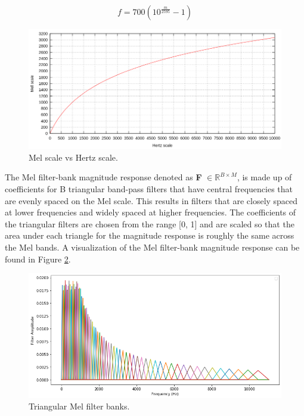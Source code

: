 \begin{equation}
\label{eq:mel2freq}
    f = 700 \left(10^{\frac{m}{2595}} - 1 \right)
\end{equation}


\begin{figure}[htbp]
   \begin{center}
      \includegraphics[width=0.8\linewidth]{Chapitre1/figures/Mel-Hz_plot.svg.png}
   \end{center}
   \caption
   {Mel scale vs Hertz scale.}
   \label{fig:melvshertz}
\end{figure}


The Mel filter-bank magnitude response denoted as \textbf{F} $ \in \mathbb{R} ^{B \times M}$, is made up of coefficients for B triangular band-pass filters that have central frequencies that are evenly spaced on the Mel scale. This results in filters that are closely spaced at lower frequencies and widely spaced at higher frequencies. The coefficients of the triangular filters are chosen from the range [0, 1] and are scaled so that the area under each triangle for the magnitude response is roughly the same across the Mel bands. A visualization of the Mel filter-bank magnitude response can be found in Figure \ref{fig:melfilterbanks}.

\begin{figure}[htbp]
   \begin{center}
      \includegraphics[width=0.8\linewidth]{Chapitre1/figures/triangular.png}
   \end{center}
   \caption{ Triangular Mel filter banks.}
   \label{fig:melfilterbanks}
\end{figure}


